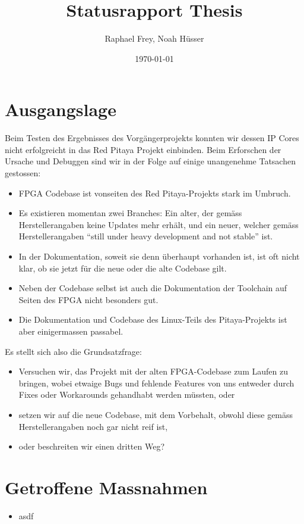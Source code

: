 \documentclass[11pt]{article}
\author{Raphael Frey, Noah H\"usser}
\title{Statusrapport Thesis}
\date{\today}
\begin{document}
\maketitle
\section{Ausgangslage}

Beim  Testen des  Ergebnisses des  Vorg\"angerprojekts konnten  wir dessen  IP
Cores nicht erfolgreicht in das Red Pitaya Projekt einbinden.  Beim Erforschen
der  Ursache  und Debuggen  sind  wir  in  der  Folge auf  einige  unangenehme
Tatsachen gestossen:

\begin{itemize}
    \item FPGA Codebase ist vonseiten des Red Pitaya-Projekts stark im Umbruch.

    \item  Es  existieren  momentan  zwei Branches: Ein  alter,  der  gem\"ass
    Herstellerangaben  keine Updates  mehr  erh\"alt, und  ein neuer,  welcher
    gem\"ass  Herstellerangaben  ``still  under   heavy  development  and  not
    stable'' ist.

    \item In der Dokumentation, soweit sie denn \"uberhaupt vorhanden ist, ist
    oft nicht klar, ob sie jetzt f\"ur die neue oder die alte Codebase gilt.

    \item Neben der  Codebase selbst ist auch die  Dokumentation der Toolchain
    auf Seiten des FPGA nicht besonders gut.

    \item Die  Dokumentation und Codebase des  Linux-Teils des Pitaya-Projekts
    ist aber einigermassen passabel.
\end{itemize}

Es stellt sich also die Grundsatzfrage: 

\begin{itemize}
    \item Versuchen wir, das Projekt mit der alten FPGA-Codebase zum Laufen zu
    bringen, wobei etwaige  Bugs und fehlende Features von  uns entweder durch
    Fixes oder Workarounds gehandhabt werden m\"ussten, oder
    \item setzen  wir auf die neue  Codebase, mit dem Vorbehalt,  obwohl diese
    gem\"ass Herstellerangaben noch gar nicht reif ist,
    \item oder beschreiten wir einen dritten Weg?
\end{itemize}

\section{Getroffene Massnahmen}
\begin{itemize}
    \item asdf
\end{itemize}
\end{document}
